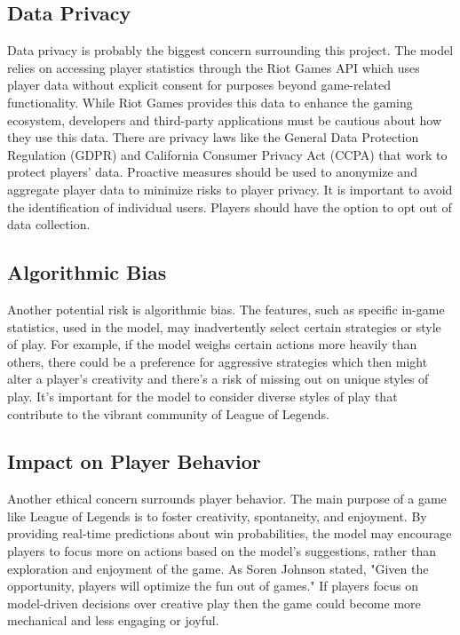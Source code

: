 \documentclass[10pt,twocolumn]{article}
\begin{document}
\subsection{Data Privacy}
Data privacy is probably the biggest concern surrounding this project. The model relies on accessing player statistics through the Riot Games API which uses player data without explicit consent for purposes beyond game-related functionality. While Riot Games provides this data to enhance the gaming ecosystem, developers and third-party applications must be cautious about how they use this data. There are privacy laws like the General Data Protection Regulation (GDPR) and California Consumer Privacy Act (CCPA) that work to protect players' data. Proactive measures should be used to anonymize and aggregate player data to minimize risks to player privacy. It is important to avoid the identification of individual users. Players should have the option to opt out of data collection.

\subsection{Algorithmic Bias}
Another potential risk is algorithmic bias. The features, such as specific in-game statistics, used in the model, may inadvertently select certain strategies or style of play. For example, if the model weighs certain actions more heavily than others, there could be a preference for aggressive strategies which then might alter a player's creativity and there's a risk of missing out on unique styles of play. It's important for the model to consider diverse styles of play that contribute to the vibrant community of League of Legends.

\subsection{Impact on Player Behavior}
Another ethical concern surrounds player behavior. The main purpose of a game like League of Legends is to foster creativity, spontaneity, and enjoyment. By providing real-time predictions about win probabilities, the model may encourage players to focus more on actions based on the model's suggestions, rather than exploration and enjoyment of the game. As Soren Johnson stated, "Given the opportunity, players will optimize the fun out of games." If players focus on model-driven decisions over creative play then the game could become more mechanical and less engaging or joyful.
\end{document}
